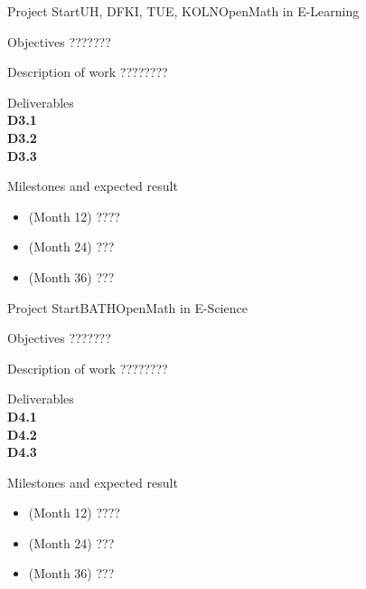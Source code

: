 \documentclass{euproposal}
\begin{document}
\begin{workpackage}{36}{3}{Project Start}{UH, DFKI, TUE, KOLN}{OpenMath in E-Learning}
\begin{wpbox}{Objectives}
???????
\end{wpbox}
\begin{wpbox}{Description of work}
  ????????
\end{wpbox}
\begin{wpbox}{Deliverables\\}
{\bf D3.1} \\
{\bf D3.2} \\
{\bf D3.3} 
\end{wpbox}
\begin{wpbox}{Milestones and expected result}
\begin{itemize}
\item (Month 12) ????
\item (Month 24) ???
\item (Month 36) ???
\end{itemize}
\end{wpbox}
\end{workpackage}
\newpage
\begin{workpackage}{36}{4}{Project Start}{BATH}{OpenMath in E-Science}
\begin{wpbox}{Objectives}
???????
\end{wpbox}
\begin{wpbox}{Description of work}
  ????????
\end{wpbox}
\begin{wpbox}{Deliverables\\}
{\bf D4.1} \\
{\bf D4.2} \\
{\bf D4.3} 
\end{wpbox}
\begin{wpbox}{Milestones and expected result}
\begin{itemize}
\item (Month 12) ????
\item (Month 24) ???
\item (Month 36) ???
\end{itemize}
\end{wpbox}
\end{workpackage}
\newpage
\end{document}
